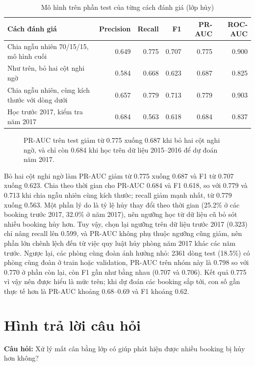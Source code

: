 \begin{table}[H]
\centering
\caption{Mô hình trên phần test của từng cách đánh giá (lớp hủy)}
\label{tab:tab-robust}
\small\setlength{\tabcolsep}{4pt}
\begin{tabular}{lrrrrr}
\toprule
Cách đánh giá & Precision & Recall & F1 & PR-AUC & ROC-AUC\\
\midrule
Chia ngẫu nhiên 70/15/15, mô hình cuối & 0.649 & 0.775 & 0.707 & 0.775 & 0.900\\
Như trên, bỏ hai cột nghi ngờ & 0.584 & 0.668 & 0.623 & 0.687 & 0.825\\
Chia ngẫu nhiên, cùng kích thước với dòng dưới & 0.657 & 0.779 & 0.713 & 0.779 & 0.903\\
Học trước 2017, kiểm tra năm 2017 & 0.684 & 0.563 & 0.618 & 0.684 & 0.837\\
\bottomrule
\end{tabular}
\end{table}

\begin{figure}[H]
\centering
{}
\caption{PR-AUC trên test giảm từ 0.775 xuống 0.687 khi bỏ hai cột nghi ngờ, và chỉ còn 0.684 khi học trên dữ liệu 2015--2016 để dự đoán năm 2017.}
\label{fig:tab-robust}
\end{figure}

Bỏ hai cột nghi ngờ làm PR-AUC giảm từ 0.775 xuống 0.687 và F1 từ 0.707 xuống 0.623. Chia theo thời gian cho PR-AUC 0.684 và F1 0.618,
so với 0.779 và 0.713 khi chia ngẫu nhiên cùng kích thước; recall giảm mạnh nhất, từ 0.779 xuống 0.563. Một phần lý do là tỷ lệ hủy
thay đổi theo thời gian (25.2\% ở các booking trước 2017, 32.0\% ở năm 2017), nên ngưỡng học từ dữ liệu cũ bỏ sót nhiều booking hủy hơn.
Tuy vậy, chọn lại ngưỡng trên dữ liệu trước 2017 (0.323) chỉ nâng recall lên 0.599, và PR-AUC không phụ thuộc ngưỡng cũng giảm,
nên phần lớn chênh lệch đến từ việc quy luật hủy phòng năm 2017 khác các năm trước. Ngược lại, các phòng cùng đoàn ảnh hưởng nhỏ:
2361 dòng test (18.5\%) có phòng cùng đoàn ở train hoặc validation, PR-AUC trên nhóm này là 0.798 so với 0.770 ở phần còn lại,
còn F1 gần như bằng nhau (0.707 và 0.706). Kết quả 0.775 vì vậy nên được hiểu là mức trên; khi dự đoán các booking sắp tới,
con số gần thực tế hơn là PR-AUC khoảng 0.68--0.69 và F1 khoảng 0.62.

\section{Hình trả lời câu hỏi}
\textbf{Câu hỏi:} Xử lý mất cân bằng lớp có giúp phát hiện được nhiều booking bị hủy hơn không?

